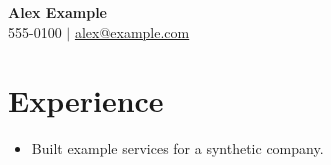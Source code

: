 \documentclass[letterpaper,11pt]{article}
\begin{document}
\begin{center}
\textbf{\Huge Alex Example} \\ \small 555-0100 $|$ \href{mailto:alex@example.com}{alex@example.com}
\end{center}
\section{Experience}
\begin{itemize}
\item Built example services for a synthetic company.
\end{itemize}
\end{document}
